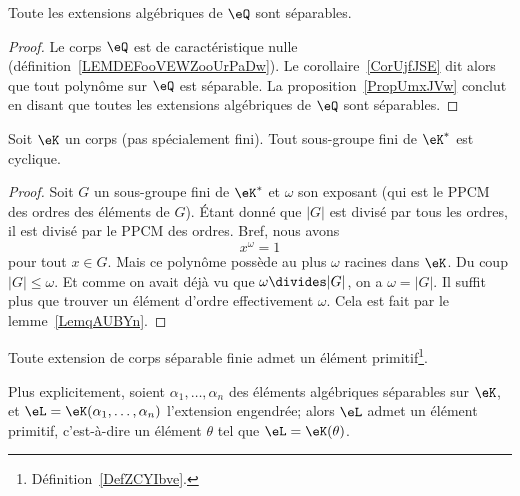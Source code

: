 \begin{corollary}  \label{CORooNZZMooIoBYXY}
    Toute les extensions algébriques de \( \eQ\) sont séparables.
\end{corollary}

\begin{proof}
    Le corps \( \eQ\) est de caractéristique nulle (définition~\ref{LEMDEFooVEWZooUrPaDw}). Le corollaire~\ref{CorUjfJSE} dit alors que tout polynôme sur \( \eQ\) est séparable. La proposition~\ref{PropUmxJVw} conclut en disant que toutes les extensions algébriques de \( \eQ\) sont séparables.
\end{proof}

\begin{theorem}      \label{ThobkwCMm}
    Soit \( \eK\) un corps (pas spécialement fini). Tout sous-groupe fini de \( \eK^*\) est cyclique.
\end{theorem}

\begin{proof}
    Soit \( G\) un sous-groupe fini de \( \eK^*\) et \( \omega\) son exposant (qui est le PPCM des ordres des éléments de \( G\)). Étant donné que \( | G |\) est divisé par tous les ordres, il est divisé par le PPCM des ordres. Bref, nous avons
    \begin{equation}
        x^{\omega}=1
    \end{equation}
    pour tout \( x\in G\). Mais ce polynôme possède au plus \( \omega\) racines dans \( \eK\). Du coup \( | G |\leq \omega\). Et comme on avait déjà vu que \( \omega\divides | G |\), on a \( \omega=| G |\). Il suffit plus que trouver un élément d'ordre effectivement \( \omega\). Cela est fait par le lemme~\ref{LemqAUBYn}.
\end{proof}

\begin{theorem}   \label{ThoORxgBC}
    Toute extension de corps séparable finie admet un élément primitif\footnote{Définition~\ref{DefZCYIbve}.}.

    Plus explicitement, soient \( \alpha_1,\ldots, \alpha_n\) des éléments algébriques séparables sur \( \eK\), et \( \eL=\eK(\alpha_1,\ldots, \alpha_n)\) l'extension engendrée; alors \( \eL \) admet un élément primitif, c'est-à-dire un élément \( \theta \) tel que \( \eL = \eK(\theta)\).
\end{theorem}

